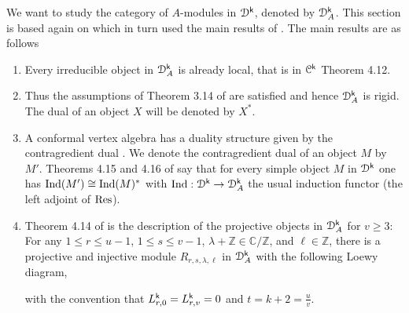 \documentclass[a4paper, reqno]{amsart}
\theoremstyle{introTheorems}
\def\CC{\mathbb{C}}
\def\ZZ{\mathbb{Z}}
\newcommand\cC{\mathcal{C}}
\newcommand\cD{\mathcal{D}}
\newcommand{\Ind}{\textup{Ind}}
\newcommand{\Res}{\textup{Res}}
\renewcommand{\1}{\mathbbold{1}}
\begin{document}
We want to study the category of $A$-modules in $\cD^\k$, denoted by $\cD^\k_A$. 
This section is based again on \cite{CMY1} which in turn used the main results of \cite{CMSY24}. The main results are as follows
\begin{enumerate}
    \item Every irreducible object in $\cD^\k_A$ is already local, that is in $\cC^\k$ \cite{CMY1} Theorem 4.12.
    \item Thus the assumptions of Theorem 3.14 of \cite{CMSY24} are satisfied and hence $\cD^\k_A$ is rigid. The dual of an object $X$ will be denoted by $X^*$.
    \item A conformal vertex algebra has a duality structure given by the contragredient dual \cite{ALSW21}. We denote the contragredient dual of an object $M$ by $M'$. Theorems 4.15 and 4.16 of \cite{CMY1} say that for every simple object $M$ in $\cD^\k$ one has $\Ind(M') \cong \Ind(M)^*$ with $\Ind: \cD^\k \rightarrow \cD^\k_A$ the usual induction functor (the left adjoint of $\Res$).
\item Theorem 4.14 of \cite{CMY1} is the description of the projective objects in $\cD^\k_A$ for $v\geq 3$: For any $1\leq r\leq u-1$, $1\leq s\leq v-1$, $\lambda+\ZZ \in \CC/\ZZ$, and $\ell \in \ZZ$,
    there is a projective and injective module $R_{r,s, \lambda, \ell}$ in $\cD^\k_A$ with the following Loewy diagram, 
    \begin{center}
\end{center}
with the convention that $L^{\mathsf{k}}_{r, 0} = L^{\mathsf{k}}_{r, v} = 0$ and $t = k+2 = \frac{u}{v}$.


\end{enumerate}
\end{document}
